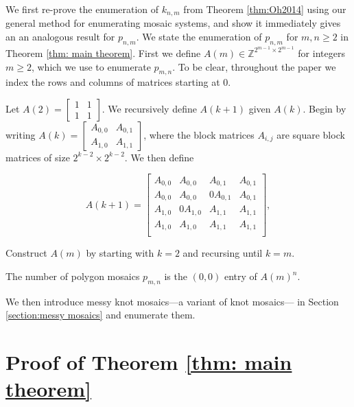 

We first re-prove the enumeration of $k_{n,m}$ from Theorem \ref{thm:Oh2014} using our general method for enumerating mosaic systems, and show it immediately gives an an analogous result for $p_{n,m}$. We state the enumeration of $p_{n,m}$ for $m,n \geq 2$ in Theorem \ref{thm: main theorem}. First we define $A(m) \in \mathbb{Z}^{2^{m-1} \times 2^{m-1}}$ for integers $m \geq 2$, which we use to enumerate $p_{m,n}$. To be clear, throughout the paper we index the rows and columns of matrices starting at $0$.

\begin{defn}
\label{defn: A}

Let $A(2) = \begin{bmatrix}
1 & 1 \\
1 & 1
\end{bmatrix}
$. We recursively define $A(k+1)$ given $A(k)$. Begin by writing
$
A(k) = \begin{bmatrix}
A_{0,0} & A_{0,1} \\
A_{1,0} & A_{1,1}
\end{bmatrix}
$, where the block matrices $A_{i,j}$ are square block matrices of size $2^{k-2} \times 2^{k-2}$. We then define

$$
A(k+1) = \begin{bmatrix}
A_{0,0} & A_{0,0} & A_{0,1} & A_{0,1} \\
A_{0,0} & A_{0,0} & 0A_{0,1} & A_{0,1} \\
A_{1,0} & 0A_{1,0} & A_{1,1} & A_{1,1} \\
A_{1,0} & A_{1,0} & A_{1,1} & A_{1,1} \\
\end{bmatrix},
$$

Construct $A(m)$ by starting with $k=2$ and recursing until $k=m$. 

\end{defn}

\begin{thm}
\label{thm: main theorem}    
The number of polygon mosaics $p_{m,n}$ is the $(0,0)$ entry of $A(m)^n$.
\end{thm}

We then introduce messy knot mosaics—a variant of knot mosaics— in Section \ref{section:messy mosaics} and enumerate them.

\section{Proof of Theorem \ref{thm: main theorem}}

